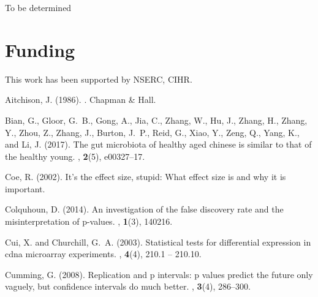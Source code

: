 \documentclass{bioinfo}
\begin{document}
To be determined

\vspace{-12pt}
\section*{Funding}

This work has been supported by NSERC, CIHR.\vspace*{-12pt}

%
%
%
%

%
%
%
%


%
\begin{thebibliography}{}

Aitchison, J. (1986).
.
\newblock Chapman \& Hall.

Bian, G., Gloor, G.~B., Gong, A., Jia, C., Zhang, W., Hu, J., Zhang, H., Zhang,
  Y., Zhou, Z., Zhang, J., Burton, J.~P., Reid, G., Xiao, Y., Zeng, Q., Yang,
  K., and Li, J. (2017).
\newblock The gut microbiota of healthy aged chinese is similar to that of the
  healthy young.
, {\bf 2}(5), e00327--17.

Coe, R. (2002).
\newblock It's the effect size, stupid: What effect size is and why it is
  important.

Colquhoun, D. (2014).
\newblock An investigation of the false discovery rate and the
  misinterpretation of p-values.
, {\bf 1}(3), 140216.

Cui, X. and Churchill, G.~A. (2003).
\newblock Statistical tests for differential expression in cdna microarray
  experiments.
, {\bf 4}(4), 210.1 -- 210.10.

Cumming, G. (2008).
\newblock Replication and p intervals: p values predict the future only
  vaguely, but confidence intervals do much better.
, {\bf 3}(4), 286--300.


\end{thebibliography}
\end{document}
